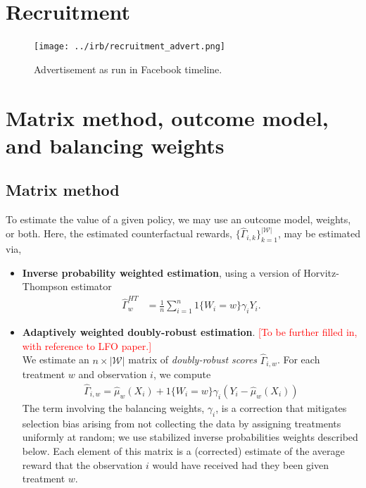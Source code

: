 \documentclass[letterpaper, 12pt, parskip=full,DIV=12]{scrartcl}
\begin{document}
\clearpage
\appendix

\section{Recruitment}\label{recruitment}

\begin{figure}[htb]
\centering
\caption{Advertisement as run in Facebook timeline.}
\label{fig:ad}
\texttt{[image: ../irb/recruitment\_advert.png]}
\end{figure}


\section{Matrix method, outcome model, and balancing weights}
\subsection{Matrix method} 
To estimate the value of a given policy, we may use an outcome model, weights, or both. Here, the estimated counterfactual rewards, $\{\hat{\Gamma}_{i,k}\}_{k=1}^{|\mathcal{W}|}$, may be estimated via,
\begin{itemize}
\item \textbf{Inverse probability weighted estimation}, using a version of Horvitz-Thompson estimator \citep{horvitz1952}
\begin{align}
\hat{\Gamma}_w^{HT} & =  \frac{1}{n} \sum_{i = 1}^n 1 \{ W_i = w\} \gamma_i Y_i. 
\end{align}
\item \textbf{Adaptively weighted doubly-robust estimation}. 
\label{appendix:doubly-robust}
\textcolor{red}{[To be further filled in, with reference to LFO paper.]}\\
We estimate an $n \times |\mathcal{W}|$ matrix of \textit{doubly-robust scores} $\hat{\Gamma}_{i,w}$. For each treatment $w$ and observation $i$, we compute    
      \begin{align}
        \hat{\Gamma}_{i,w} = \hat{\mu}_{w}(X_{i}) + 1 \{W_i = w \} \gamma_{i}(Y_{i} - \hat{\mu}_w(X_i))
    \end{align}
  The term involving the balancing weights, $\gamma_i$, is a correction that mitigates selection bias arising from not collecting the data by assigning treatments uniformly at random; we use stabilized inverse probabilities weights described below. Each element of this matrix is a (corrected) estimate of the average reward that the observation $i$ would have received had they been given treatment $w$.
\end{itemize}
\end{document}
